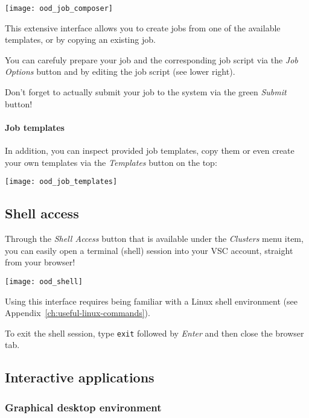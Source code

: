 \begin{center}
    \texttt{[image: ood\_job\_composer]}
\end{center}

This extensive interface allows you to create jobs from one of the available templates,
or by copying an existing job.

You can carefuly prepare your job and the corresponding job script via the \emph{Job Options} button
and by editing the job script (see lower right).

Don't forget to actually submit your job to the system via the green \emph{Submit} button!

\paragraph{Job templates}

In addition, you can inspect provided job templates, copy them or even create your own templates via the \emph{Templates} button on the top:

\begin{center}
    \texttt{[image: ood\_job\_templates]}
\end{center}

\subsection{Shell access}

Through the \emph{Shell Access} button that is available under the \emph{Clusters} menu item,
you can easily open a terminal (shell) session into your VSC account, straight from your browser!

\begin{center}
    \texttt{[image: ood\_shell]}
\end{center}

Using this interface requires being familiar with a Linux shell environment (see Appendix~\ref{ch:useful-linux-commands}).

To exit the shell session, type \lstinline|exit| followed by \emph{Enter} and then close the browser tab.

\subsection{Interactive applications}

\subsubsection{Graphical desktop environment}

